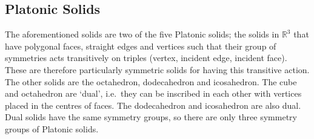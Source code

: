 \subsection{Platonic Solids}
The aforementioned solids are two of the five Platonic solids; the solids in \(\mathbb R^3\) that have polygonal faces, straight edges and vertices such that their group of symmetries acts transitively on triples (vertex, incident edge, incident face). These are therefore particularly symmetric solids for having this transitive action. The other solids are the octahedron, dodecahedron and icosahedron. The cube and octahedron are `dual', i.e.\ they can be inscribed in each other with vertices placed in the centres of faces. The dodecahedron and icosahedron are also dual. Dual solids have the same symmetry groups, so there are only three symmetry groups of Platonic solids.

